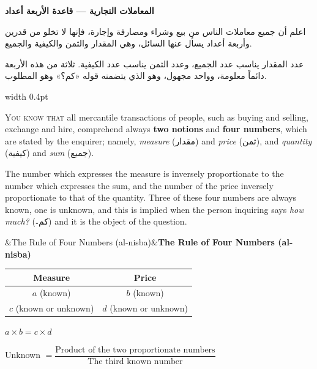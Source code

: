 \documentclass[11pt,a4paper,openany,oneside]{book}
\newcommand{\ar}[1]{{\arabicfont\beginR #1\endR}}
\newenvironment{transbox}[1][]{%
  \smallskip\par\noindent
  \begin{lrbox}{\transboxsave}
  \begin{minipage}{\dimexpr\linewidth-2\fboxsep-2\fboxrule\relax}%
  \setlength{\parskip}{0.3em}%
  \ifx&#1&\else\textbf{#1}\\[0.2cm]\fi
}{%
  \end{minipage}%
  \end{lrbox}
  \fcolorbox{rulecolor}{transbg}{\usebox{\transboxsave}}%
  \smallskip}
\begin{document}
\noindent\begin{minipage}[t]{0.48\textwidth}
\raggedleft

\begin{Arabic}
\textbf{المعاملات التجارية — قاعدة الأربعة أعداد}

اعلم أن جميع معاملات الناس من بيع وشراء ومصارفة وإجارة، فإنها لا تخلو من قدرين وأربعة أعداد يسأل عنها السائل، وهي المقدار والثمن والكيفية والجميع.

عدد المقدار يناسب عدد الجميع، وعدد الثمن يناسب عدد الكيفية. ثلاثة من هذه الأربعة دائماً معلومة، وواحد مجهول، وهو الذي يتضمنه قوله «كم؟» وهو المطلوب.
\end{Arabic}

\end{minipage}%
\hfill\vrule width 0.4pt\hfill
\begin{minipage}[t]{0.48\textwidth}
\raggedright

\lettrine[lines=2, lhang=0.33, nindent=0em, findent=3pt, loversize=0.14]{
\textcolor{dropgold}{Y}}{ou know that} all mercantile transactions of people, such as buying and selling, exchange and hire, comprehend always \textbf{two notions} and \textbf{four numbers}, which are stated by the enquirer; namely, \textit{measure} (\ar{مقدار}) and \textit{price} (\ar{ثمن}), and \textit{quantity} (\ar{كيفية}) and \textit{sum} (\ar{جميع}).

The number which expresses the measure is inversely proportionate to the number which expresses the sum, and the number of the price inversely proportionate to that of the quantity. Three of these four numbers are always known, one is unknown, and this is implied when the person inquiring says \textit{how much?} (\ar{كم؞}) and it is the object of the question.

\begin{transbox}[The Rule of Four Numbers (al-nisba)]
\begin{center}
\begin{tabular}{c|c}
\textbf{Measure} & \textbf{Price} \\
\hline
$a$ (known) & $b$ (known) \\
$c$ (known or unknown) & $d$ (known or unknown) \\
\end{tabular}

\vspace{0.2cm}

$a \times b = c \times d$ \quad{}

Unknown $= \dfrac{\text{Product of the two proportionate numbers}}{\text{The third known number}}$
\end{center}
\end{transbox}

\end{minipage}
\vspace{0.3cm}
\end{document}
